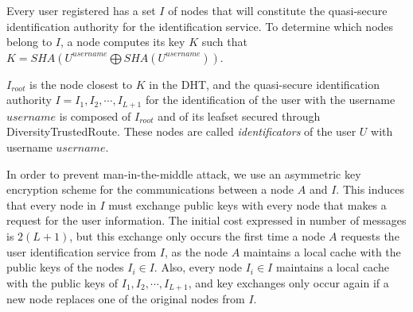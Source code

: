 Every user registered has a set $I$ of nodes that
will constitute the quasi-secure identification authority for the
identification service.
To determine which  nodes belong to $I$, a node computes its key $K$ such that
$K = SHA(U^{username} \bigoplus SHA(U^{username}))$. 

$I_{root}$ is the node closest to $K$ in the DHT, and the quasi-secure identification authority $I =
{I_1, I_2, \cdots, I_{L+1}}$ for the identification of the user with the
username $username$ is composed of $I_{root}$ and of its leafset secured
through DiversityTrustedRoute. These nodes are called \textit{identificators} of the
user $U$ with username $username$.

 In order to prevent man-in-the-middle attack, we use an asymmetric key
encryption scheme for the communications between a node $A$ and $I$. This
induces that every node in $I$ must exchange public keys with every node that
makes a request for the user information. The initial cost expressed in number
of messages is $2(L+1)$, but this exchange only occurs the first time a
node $A$ requests the user identification service from $I$, as the node $A$
maintains a local cache with the public keys of the nodes $I_i \in I$. Also,
every node $I_i \in I$ maintains a local cache with the public keys of ${I_1,
I_2, \cdots, I_{L+1}}$, and key exchanges only occur again if a new node
replaces one of the original nodes from $I$.


